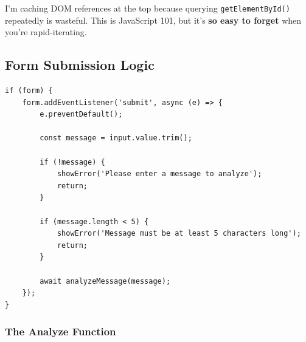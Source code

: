 \documentclass[12pt, a4paper]{article}
\begin{document}
\begin{devnote}
I'm caching DOM references at the top because querying \texttt{getElementById()} repeatedly is wasteful. This is JavaScript 101, but it's \textbf{so easy to forget} when you're rapid-iterating.
\end{devnote}

\subsection{Form Submission Logic}

\begin{verbatim}
if (form) {
    form.addEventListener('submit', async (e) => {
        e.preventDefault();
        
        const message = input.value.trim();
        
        if (!message) {
            showError('Please enter a message to analyze');
            return;
        }
        
        if (message.length < 5) {
            showError('Message must be at least 5 characters long');
            return;
        }
        
        await analyzeMessage(message);
    });
}
\end{verbatim}

\subsubsection{The Analyze Function}
\end{document}
